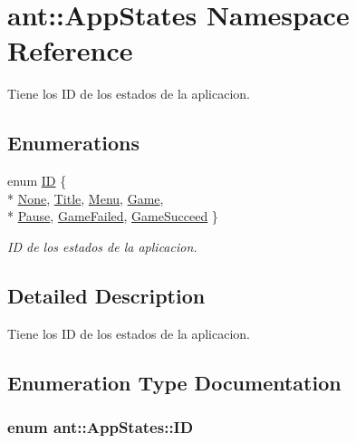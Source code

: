 \hypertarget{namespaceant_1_1_app_states}{\section{ant\+:\+:App\+States Namespace Reference}
\label{namespaceant_1_1_app_states}
}


Tiene los I\+D de los estados de la aplicacion.  


\subsection*{Enumerations}
\begin{DoxyCompactItemize}
\item 
enum \hyperlink{namespaceant_1_1_app_states_a8e30476d77a5da5e0c1c3b9c7042e62a}{I\+D} \{ \\*
\hyperlink{namespaceant_1_1_app_states_a8e30476d77a5da5e0c1c3b9c7042e62aa117060da2885bd6f439fad622d3aa637}{None}, 
\hyperlink{namespaceant_1_1_app_states_a8e30476d77a5da5e0c1c3b9c7042e62aacb875ab79bfd3c15c613fb0e3f887ea1}{Title}, 
\hyperlink{namespaceant_1_1_app_states_a8e30476d77a5da5e0c1c3b9c7042e62aa16080a22b3bdef30ff6ae0591a018ce7}{Menu}, 
\hyperlink{namespaceant_1_1_app_states_a8e30476d77a5da5e0c1c3b9c7042e62aa8409a570c8b6a9a3249df8202f847460}{Game}, 
\\*
\hyperlink{namespaceant_1_1_app_states_a8e30476d77a5da5e0c1c3b9c7042e62aa619a7496eeea858776c64ac61baf7e07}{Pause}, 
\hyperlink{namespaceant_1_1_app_states_a8e30476d77a5da5e0c1c3b9c7042e62aa833ce1d372d37447b5796014c751c782}{Game\+Failed}, 
\hyperlink{namespaceant_1_1_app_states_a8e30476d77a5da5e0c1c3b9c7042e62aa3cd27be31490f3508411483ac5703918}{Game\+Succeed}
 \}
\begin{DoxyCompactList}\small\item\em I\+D de los estados de la aplicacion. \end{DoxyCompactList}\end{DoxyCompactItemize}


\subsection{Detailed Description}
Tiene los I\+D de los estados de la aplicacion. 

\subsection{Enumeration Type Documentation}
\hypertarget{namespaceant_1_1_app_states_a8e30476d77a5da5e0c1c3b9c7042e62a}{
\subsubsection[{I\+D}]{\setlength{\rightskip}{0pt plus 5cm}enum {\bf ant\+::\+App\+States\+::\+I\+D}}}\label{namespaceant_1_1_app_states_a8e30476d77a5da5e0c1c3b9c7042e62a}


